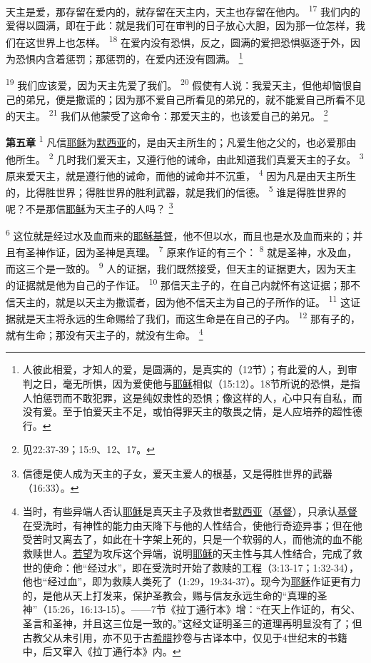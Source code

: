 \begin{multicols}{2}
天主是爱，那存留在爱内的，就存留在天主内，天主也存留在他内。
\textsuperscript{17}
我们内的爱得以圆满，即在于此：就是我们可在审判的日子放心大胆，因为那一位怎样，我们在这世界上也怎样。
\textsuperscript{18}
在爱内没有恐惧，反之，圆满的爱把恐惧驱逐于外，因为恐惧内含着惩罚；那惩罚的，在爱内还没有圆满。
\footnote{人彼此相爱，才知人的爱，是圆满的，是真实的（12节）；有此爱的人，到审判之日，毫无所惧，因为爱使他与\uline{耶稣}相似（15:12）。18节所说的恐惧，是指人怕惩罚而不敢犯罪，这是纯奴隶性的恐惧；像这样的人，心中只有自私，而没有爱。至于怕爱天主不足，或怕得罪天主的敬畏之情，是人应培养的超性德行。}

\textsuperscript{19}
我们应该爱，因为天主先爱了我们。
\textsuperscript{20}
假使有人说：我爱天主，但他却恼恨自己的弟兄，便是撒谎的；因为那不爱自己所看见的弟兄的，就不能爱自己所看不见的天主。
\textsuperscript{21}
我们从他蒙受了这命令：那爱天主的，也该爱自己的弟兄。
\footnote{见22:37-39；15:9、12、17。}

\textbf{第五章\quad}
\textsuperscript{1}
凡信\uline{耶稣}为\uline{默西亚}的，是由天主所生的；凡爱生他之父的，也必爱那由他所生。
\textsuperscript{2}
几时我们爱天主，又遵行他的诫命，由此知道我们真爱天主的子女。
\textsuperscript{3}
原来爱天主，就是遵行他的诫命，而他的诫命并不沉重，
\textsuperscript{4}
因为凡是由天主所生的，比得胜世界；得胜世界的胜利武器，就是我们的信德。
\textsuperscript{5}
谁是得胜世界的呢？不是那信\uline{耶稣}为天主子的人吗？
\footnote{信德是使人成为天主的子女，爱天主爱人的根基，又是得胜世界的武器（16:33）。}

\textsuperscript{6}
这位就是经过水及血而来的\uline{耶稣}\uline{基督}，他不但以水，而且也是水及血而来的；并且有圣神作证，因为圣神是真理。
\textsuperscript{7}
原来作证的有三个：
\textsuperscript{8}
就是圣神，水及血，而这三个是一致的。
\textsuperscript{9}
人的证据，我们既然接受，但天主的证据更大，因为天主的证据就是他为自己的子作证。
\textsuperscript{10}
那信天主子的，在自己内就怀有这证据；那不信天主的，就是以天主为撒谎者，因为他不信天主为自己的子所作的证。
\textsuperscript{11}
这证据就是天主将永远的生命赐给了我们，而这生命是在自己的子内。
\textsuperscript{12}
那有子的，就有生命；那没有天主子的，就没有生命。
\footnote{当时，有些异端人否认\uline{耶稣}是真天主子及救世者\uline{默西亚}（\uline{基督}），只承认\uline{基督}在受洗时，有神性的能力由天降下与他的人性结合，使他行奇迹异事；但在他受苦时又离去了，如此在十字架上死的，只是一个软弱的人，而他流的血不能救赎世人。\uline{若望}为攻斥这个异端，说明\uline{耶稣}的天主性与其人性结合，完成了救世的使命：他“经过水”，即在受洗时开始了救赎的工程（3:13-17；1:32-34），他也“经过血”，即为救赎人类死了（1:29，19:34-37）。现今为\uline{耶稣}作证更有力的，是他从天上打发来，保护圣教会，赐与信友永远生命的“真理的圣神”（15:26，16:13-15）。——7节《拉丁通行本》增：“在天上作证的，有父、圣言和圣神，并且这三位是一致的。”这经文证明圣三的道理再明显没有了；但古教父从未引用，亦不见于古\uline{希腊}抄卷与古译本中，仅见于4世纪末的书籍中，后又窜入《拉丁通行本》内。}


\end{multicols}
